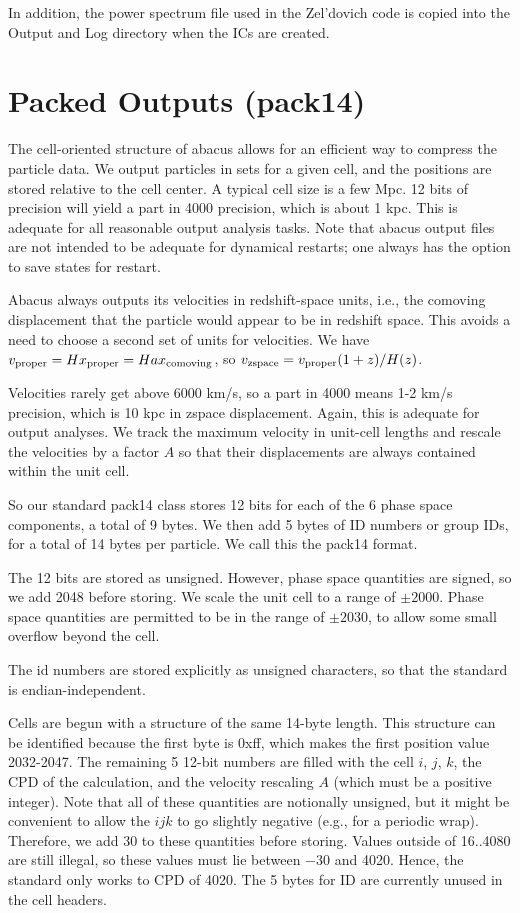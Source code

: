 \documentclass[11pt,preprint]{aastex}
\begin{document}
In addition, the power spectrum file used in the Zel'dovich code
is copied into the Output and Log directory when the ICs are created.

\section{Packed Outputs (pack14)}

The cell-oriented structure of abacus allows for an efficient way
to compress the particle data.  We output particles in sets for a
given cell, and the positions are stored relative to the cell center.
A typical cell size is a few Mpc.  12 bits of precision will yield
a part in 4000 precision, which is about 1 kpc.  This is adequate
for all reasonable output analysis tasks.  Note that abacus output
files are not intended to be adequate for dynamical restarts; one
always has the option to save states for restart.

Abacus always outputs its velocities in redshift-space units, i.e.,
the comoving displacement that the particle would appear to be in
redshift space.  This avoids a need to choose a second set of units
for velocities.  We have $v_{\rm proper} = Hx_{\rm proper} =
Hax_{\rm comoving}$, so $v_{\rm zspace} = v_{\rm proper}(1+z)/H(z)$.

Velocities rarely get above 6000 km/s, so a part in 4000 means 1-2
km/s precision, which is 10 kpc in zspace displacement.  Again, this
is adequate for output analyses.  We track the maximum velocity 
in unit-cell lengths and rescale the velocities by a factor $A$ 
so that their displacements are always contained within the unit cell.

So our standard pack14 class stores 12 bits for each of the 6 phase
space components, a total of 9 bytes.  We then add 5 bytes of ID
numbers or group IDs, for a total of 14 bytes per particle.  We call
this the pack14 format.

The 12 bits are stored as unsigned.  However, phase space quantities
are signed, so we add 2048 before storing.  We scale the unit cell 
to a range of $\pm2000$.  Phase space quantities are permitted to 
be in the range of $\pm2030$, to allow some small overflow beyond 
the cell.

The id numbers are stored explicitly as unsigned characters, so
that the standard is endian-independent.

Cells are begun with a structure of the same 14-byte length.  This
structure can be identified because the first byte is 0xff, which
makes the first position value 2032-2047.  The remaining 5
12-bit numbers are filled with the cell $i$, $j$, $k$, the CPD 
of the calculation, and the velocity rescaling $A$ (which must be
a positive integer).  Note that all of these quantities are notionally
unsigned, but it might be convenient to allow the  $ijk$ to go slightly
negative (e.g., for a periodic wrap).  Therefore, we add 30 to these
quantities before storing.  Values outside of 16..4080 are still illegal, 
so these values must lie between $-30$ and 4020.  Hence, the standard
only works to CPD of 4020.  The 5 bytes for ID are currently unused
in the cell headers.
\end{document}
